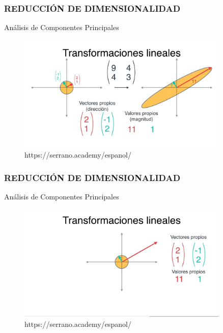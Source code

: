 \documentclass{beamer}
\begin{document}
\begin{frame}
	\frametitle{REDUCCIÓN DE DIMENSIONALIDAD}
	\begin{block}{Análisis de Componentes Principales}	
		\begin{figure}
			\includegraphics[width=0.9\textwidth]{PCA/IMG_3575.jpg}
			\caption{https://serrano.academy/espanol/}
		\end{figure}
	\end{block}
\end{frame}


\begin{frame}
	\frametitle{REDUCCIÓN DE DIMENSIONALIDAD}
	\begin{block}{Análisis de Componentes Principales}	
		\begin{figure}
			\includegraphics[width=0.9\textwidth]{PCA/IMG_3576.jpg}
			\caption{https://serrano.academy/espanol/}
		\end{figure}
	\end{block}
\end{frame}
\end{document}
